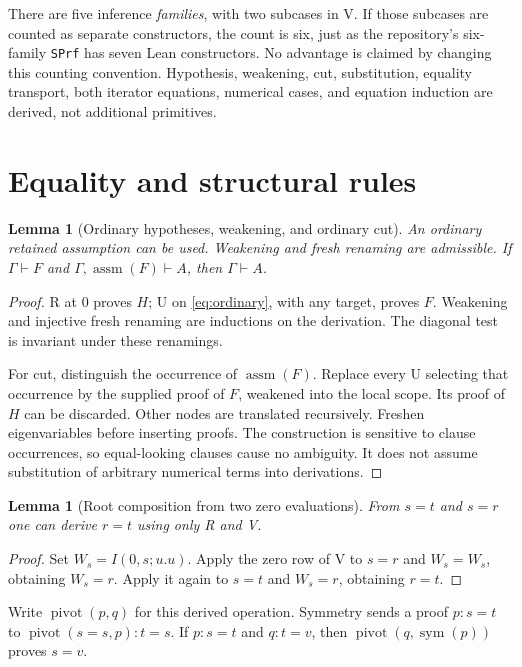 \documentclass[11pt]{article}
\newtheorem{lemma}[theorem]{Lemma}
\theoremstyle{definition}\newtheorem{definition}[theorem]{Definition}
\theoremstyle{remark}\newtheorem{remark}[theorem]{Remark}
\newcommand{\assm}{\operatorname{assm}}
\begin{document}
There are five inference \emph{families}, with two subcases in V. If those subcases are counted as separate constructors, the count is six, just as the repository's six-family \texttt{SPrf} has seven Lean constructors. No advantage is claimed by changing this counting convention. Hypothesis, weakening, cut, substitution, equality transport, both iterator equations, numerical cases, and equation induction are derived, not additional primitives.

\section{Equality and structural rules}
\label{sec:elementary}

\begin{lemma}[Ordinary hypotheses, weakening, and ordinary cut]\label{lem:cut}
An ordinary retained assumption can be used. Weakening and fresh renaming are admissible. If $\Gamma\vdash F$ and $\Gamma,\assm(F)\vdash A$, then $\Gamma\vdash A$.
\end{lemma}
\begin{proof}
R at $0$ proves $H$; U on \eqref{eq:ordinary}, with any target, proves $F$. Weakening and injective fresh renaming are inductions on the derivation. The diagonal test is invariant under these renamings.

For cut, distinguish the occurrence of $\assm(F)$. Replace every U selecting that occurrence by the supplied proof of $F$, weakened into the local scope. Its proof of $H$ can be discarded. Other nodes are translated recursively. Freshen eigenvariables before inserting proofs. The construction is sensitive to clause occurrences, so equal-looking clauses cause no ambiguity. It does not assume substitution of arbitrary numerical terms into derivations.
\end{proof}

\begin{lemma}[Root composition from two zero evaluations]\label{lem:pivot}
From $s=t$ and $s=r$ one can derive $r=t$ using only R and V.
\end{lemma}
\begin{proof}
Set $W_s=I(0,s;u.u)$. Apply the zero row of V to $s=r$ and $W_s=W_s$, obtaining $W_s=r$. Apply it again to $s=t$ and $W_s=r$, obtaining $r=t$.
\end{proof}

Write $\operatorname{pivot}(p,q)$ for this derived operation. Symmetry sends a proof $p:s=t$ to $\operatorname{pivot}(s=s,p):t=s$. If $p:s=t$ and $q:t=v$, then $\operatorname{pivot}(q,\operatorname{sym}(p))$ proves $s=v$.
\end{document}

